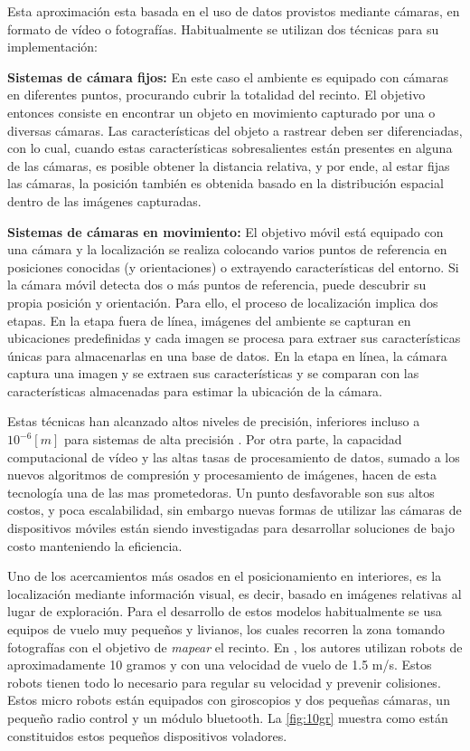 Esta aproximación esta basada en el uso de datos provistos mediante cámaras, en formato de vídeo o fotografías. Habitualmente se utilizan dos técnicas para su implementación:

\textbf{Sistemas de cámara fijos:} En este caso el ambiente es equipado con cámaras en diferentes puntos, procurando cubrir la totalidad del recinto. El objetivo entonces consiste en encontrar un objeto en movimiento capturado por una o diversas cámaras. Las características del objeto a rastrear deben ser diferenciadas, con lo cual, cuando estas características sobresalientes están presentes en alguna de las cámaras, es posible obtener la distancia relativa, y por ende, al estar fijas las cámaras, la posición también es obtenida basado en la distribución espacial dentro de las imágenes capturadas.

\textbf{Sistemas de cámaras en movimiento:} El objetivo móvil está equipado con una cámara y la localización se realiza colocando varios puntos de referencia en posiciones conocidas (y orientaciones) o extrayendo características del entorno. Si la cámara móvil detecta dos o más puntos de referencia, puede descubrir su propia posición y orientación. Para ello, el proceso de localización implica dos etapas. En la etapa fuera de línea, imágenes del ambiente se capturan en ubicaciones predefinidas y cada imagen se procesa para extraer sus características únicas para almacenarlas en una base de datos. En la etapa en línea, la cámara captura una imagen y se extraen sus características y se comparan con las características almacenadas para estimar la ubicación de la cámara.

Estas técnicas han alcanzado altos niveles de precisión, inferiores incluso a \(10^{-6} [m]\) para sistemas de alta precisión \citep{6071925}. Por otra parte, la capacidad computacional de vídeo y las altas tasas de procesamiento de datos, sumado a los nuevos algoritmos de compresión y procesamiento de imágenes, hacen de esta tecnología una de las mas prometedoras. Un punto desfavorable son sus altos costos, y poca escalabilidad, sin embargo nuevas formas de utilizar las cámaras de dispositivos móviles están siendo investigadas para desarrollar soluciones de bajo costo manteniendo la eficiencia.

Uno de los acercamientos más osados en el posicionamiento en interiores, es la localización mediante información visual, es decir, basado en imágenes relativas al lugar de exploración. Para el desarrollo de estos modelos habitualmente se usa equipos de vuelo muy pequeños y livianos, los cuales recorren la zona tomando fotografías con el objetivo de \textit{mapear} el recinto.  En \citep{4058367}, los autores utilizan robots de aproximadamente 10 gramos y con una velocidad de vuelo de 1.5 m/s. Estos robots tienen todo lo necesario para regular su velocidad y prevenir colisiones. Estos micro robots están equipados con giroscopios y dos pequeñas cámaras, un pequeño radio control y un módulo bluetooth. La \autoref{fig:10gr} muestra como están constituidos estos pequeños dispositivos voladores.\\

